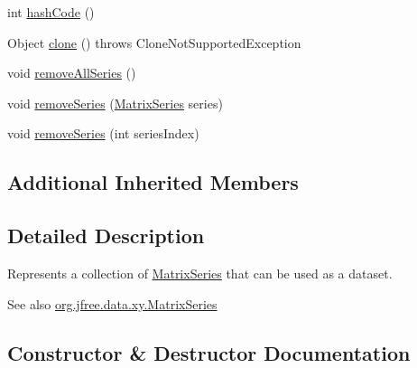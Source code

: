 \begin{DoxyCompactItemize}
\item 
int \mbox{\hyperlink{classorg_1_1jfree_1_1data_1_1xy_1_1_matrix_series_collection_a68ef1b28387a33561c934220aecde47d}{hash\+Code}} ()
\item 
Object \mbox{\hyperlink{classorg_1_1jfree_1_1data_1_1xy_1_1_matrix_series_collection_a630ab760650b152c2cdca21e09ff8ec3}{clone}} ()  throws Clone\+Not\+Supported\+Exception 
\item 
void \mbox{\hyperlink{classorg_1_1jfree_1_1data_1_1xy_1_1_matrix_series_collection_a7a47f61d88cb1b23b5f25f5d3658e18e}{remove\+All\+Series}} ()
\item 
void \mbox{\hyperlink{classorg_1_1jfree_1_1data_1_1xy_1_1_matrix_series_collection_a7184f4007e0ca8a8ae8dd158b743ad0b}{remove\+Series}} (\mbox{\hyperlink{classorg_1_1jfree_1_1data_1_1xy_1_1_matrix_series}{Matrix\+Series}} series)
\item 
void \mbox{\hyperlink{classorg_1_1jfree_1_1data_1_1xy_1_1_matrix_series_collection_a097285e62924d5fd363e354430c0d6b9}{remove\+Series}} (int series\+Index)
\end{DoxyCompactItemize}
\subsection*{Additional Inherited Members}


\subsection{Detailed Description}
Represents a collection of \mbox{\hyperlink{classorg_1_1jfree_1_1data_1_1xy_1_1_matrix_series}{Matrix\+Series}} that can be used as a dataset.

\begin{DoxySeeAlso}{See also}
\mbox{\hyperlink{classorg_1_1jfree_1_1data_1_1xy_1_1_matrix_series}{org.\+jfree.\+data.\+xy.\+Matrix\+Series}} 
\end{DoxySeeAlso}


\subsection{Constructor \& Destructor Documentation}
\mbox{\label{classorg_1_1jfree_1_1data_1_1xy_1_1_matrix_series_collection_a3f8bd3279e3d195e82d53ac7be32f703}} 
